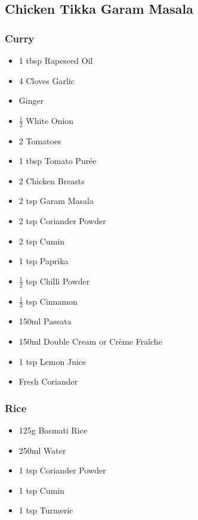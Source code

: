 \documentclass[11pt, english]{article}
\begin{document}
\newpage

	\subsection{Chicken Tikka Garam Masala}

		\subsubsection*{Curry}

	\begin{itemize}
        \setlength\itemsep{0cm}
                \item 1 tbsp Rapeseed Oil
		\item 4 Cloves Garlic
		\item Ginger
		\item $\frac{1}{2}$ White Onion
		\item 2 Tomatoes
		\item 1 tbsp Tomato Pur\'{e}e
		\item 2 Chicken Breasts
		\item 2 tsp Garam Masala
		\item 2 tsp Coriander Powder
		\item 2 tsp Cumin
		\item 1 tsp Paprika
		\item $\frac{1}{2}$ tsp Chilli Powder
		\item $\frac{1}{2}$ tsp Cinnamon
		\item 150ml Passata
		\item 150ml Double Cream or Cr\`{e}me Fra\^{i}che
		\item 1 tsp Lemon Juice
		\item Fresh Coriander
        \end{itemize}

		\subsubsection*{Rice}

	\begin{itemize}
	\setlength\itemsep{0cm}
		\item 125g Basmati Rice
		\item 250ml Water
		\item 1 tsp Coriander Powder
		\item 1 tsp Cumin
		\item 1 tsp Turmeric
	\end{itemize}
\end{document}
